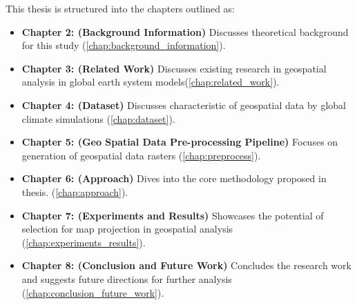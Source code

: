 This thesis is structured into the chapters outlined as:
\begin{itemize}
    \item \textbf{Chapter 2: (Background Information) } Discusses theoretical background for this study (\autoref{chap:background_information}).
    \item \textbf{Chapter 3: (Related Work) } Discusses existing research in geospatial analysis in global earth system models(\autoref{chap:related_work}).
    \item \textbf{Chapter 4: (Dataset)} Discusses characteristic of geospatial data by global climate simulations (\autoref{chap:dataset}).
    \item \textbf{Chapter 5: (Geo Spatial Data Pre-processing Pipeline)} Focuses on generation of geospatial data rasters  (\autoref{chap:preprocess}).
    \item \textbf{Chapter 6: (Approach)} Dives into the core methodology proposed in thesis.  (\autoref{chap:approach}).
    \item \textbf{Chapter 7: (Experiments and Results)} Showcases the potential of selection for map projection in geospatial analysis  (\autoref{chap:experiments_results}).
    \item \textbf{Chapter 8: (Conclusion and Future Work)} Concludes the research work and suggests future directions for further analysis  (\autoref{chap:conclusion_future_work}).
\end{itemize}
